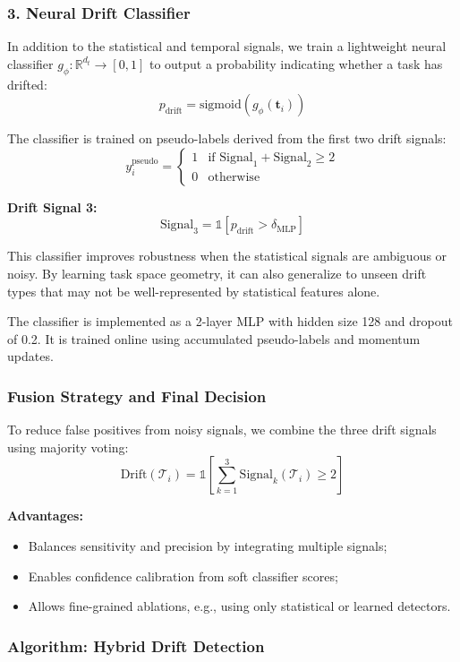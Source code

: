 \documentclass[conference]{IEEEtran}
\begin{document}
\subsubsection*{3. Neural Drift Classifier}

In addition to the statistical and temporal signals, we train a lightweight neural classifier $g_\phi: \mathbb{R}^{d_t} \rightarrow [0,1]$ to output a probability indicating whether a task has drifted:
\[
p_{\text{drift}} = \text{sigmoid}(g_\phi(\mathbf{t}_i))
\]

The classifier is trained on pseudo-labels derived from the first two drift signals:
\[
y_i^{\text{pseudo}} = 
\begin{cases}
1 & \text{if Signal}_1 + \text{Signal}_2 \geq 2 \\
0 & \text{otherwise}
\end{cases}
\]

\textbf{Drift Signal 3:}
\[
\text{Signal}_3 = \mathbb{1}[p_{\text{drift}} > \delta_{\text{MLP}}]
\]

This classifier improves robustness when the statistical signals are ambiguous or noisy. By learning task space geometry, it can also generalize to unseen drift types that may not be well-represented by statistical features alone.

The classifier is implemented as a 2-layer MLP with hidden size 128 and dropout of 0.2. It is trained online using accumulated pseudo-labels and momentum updates.

\subsubsection*{Fusion Strategy and Final Decision}

To reduce false positives from noisy signals, we combine the three drift signals using majority voting:
\[
\text{Drift}(\mathcal{T}_i) = \mathbb{1}\left[\sum_{k=1}^3 \text{Signal}_k(\mathcal{T}_i) \geq 2 \right]
\]

\textbf{Advantages:}
\begin{itemize}
    \item Balances sensitivity and precision by integrating multiple signals;
    \item Enables confidence calibration from soft classifier scores;
    \item Allows fine-grained ablations, e.g., using only statistical or learned detectors.
\end{itemize}

\subsubsection*{Algorithm: Hybrid Drift Detection}
\end{document}
